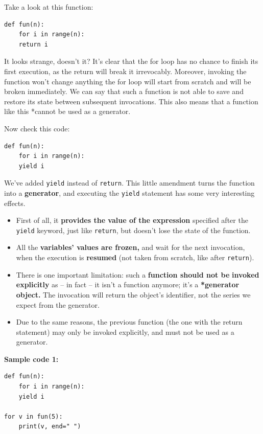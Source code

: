 \documentclass[11pt]{article}
\begin{document}
Take a look at this function:

\begin{verbatim}
def fun(n):
    for i in range(n):
	return i
\end{verbatim}

It looks strange, doesn’t it? It’s clear that the for loop has no
chance to finish its first execution, as the return will break it
irrevocably. Moreover, invoking the function won’t change anything the
for loop will start from scratch and will be broken immediately. We
can say that such a function is not able to save and restore its state
between subsequent invocations. This also means that a function like
this *cannot be used as a generator.

Now check this code:

\begin{verbatim}
def fun(n):
    for i in range(n):
	yield i
\end{verbatim}

We’ve added \texttt{yield} instead of \texttt{return}. This little amendment turns
the function into a \textbf{generator}, and executing the \texttt{yield} statement has
some very interesting effects.

\begin{itemize}
\item First of all, it \textbf{provides the value of the expression} specified
after the \texttt{yield} keyword, just like \texttt{return}, but doesn’t lose the
state of the function.
\item All the \textbf{variables’ values are frozen,} and wait for the next
invocation, when the execution is \textbf{resumed} (not taken from scratch,
like after \texttt{return}).
\item There is one important limitation: such a \textbf{function should not be}
\textbf{invoked explicitly} as – in fact – it isn’t a function anymore;
it’s a \textbf{*generator object.} The invocation will return the object’s 
identifier, not the series we expect from the generator.
\item Due to the same reasons, the previous function (the one with the
return statement) may only be invoked explicitly, and must not be
used as a generator.
\end{itemize}

\vspace{10 mm}

\textbf{Sample code 1:} 
\begin{verbatim}
def fun(n):
    for i in range(n):
	yield i

for v in fun(5):
    print(v, end=" ")
\end{verbatim}
\end{document}
